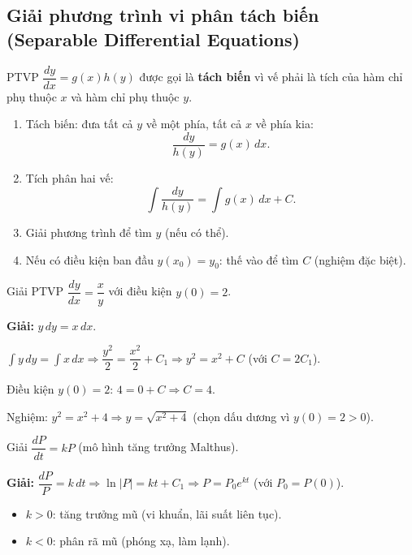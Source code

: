 \documentclass[12pt,a4paper]{article}
\begin{document}
\subsection{Giải phương trình vi phân tách biến (Separable Differential Equations)}

\begin{dinhnghia}[title={PTVP tách biến}]
  PTVP $\dfrac{dy}{dx} = g(x) h(y)$ được gọi là \textbf{tách biến} vì vế phải là tích của hàm chỉ phụ thuộc $x$ và hàm chỉ phụ thuộc $y$.
\end{dinhnghia}

\begin{phuongphap}[title={Giải PTVP tách biến}]
  \begin{enumerate}
    \item Tách biến: đưa tất cả $y$ về một phía, tất cả $x$ về phía kia:
      \[
        \frac{dy}{h(y)} = g(x)\,dx.
      \]
    \item Tích phân hai vế:
      \[
        \int \frac{dy}{h(y)} = \int g(x)\,dx + C.
      \]
    \item Giải phương trình để tìm $y$ (nếu có thể).
    \item Nếu có điều kiện ban đầu $y(x_0) = y_0$: thế vào để tìm $C$ (nghiệm đặc biệt).
  \end{enumerate}
\end{phuongphap}

\begin{vidu}
  Giải PTVP $\dfrac{dy}{dx} = \dfrac{x}{y}$ với điều kiện $y(0) = 2$.

  \medskip\textbf{Giải:}
  $y\,dy = x\,dx$.

  $\displaystyle\int y\,dy = \int x\,dx \Rightarrow \dfrac{y^2}{2} = \dfrac{x^2}{2} + C_1 \Rightarrow y^2 = x^2 + C$ (với $C = 2C_1$).

  Điều kiện $y(0) = 2$: $4 = 0 + C \Rightarrow C = 4$.

  Nghiệm: $y^2 = x^2 + 4 \Rightarrow y = \sqrt{x^2 + 4}$ (chọn dấu dương vì $y(0) = 2 > 0$).
\end{vidu}

\begin{vidu}[title={Mô hình tăng trưởng mũ / phân rã mũ}]
  Giải $\dfrac{dP}{dt} = kP$ (mô hình tăng trưởng Malthus).

  \medskip\textbf{Giải:}
  $\dfrac{dP}{P} = k\,dt \Rightarrow \ln|P| = kt + C_1 \Rightarrow P = P_0 e^{kt}$ (với $P_0 = P(0)$).

  \begin{itemize}
    \item $k > 0$: tăng trưởng mũ (vi khuẩn, lãi suất liên tục).
    \item $k < 0$: phân rã mũ (phóng xạ, làm lạnh).
  \end{itemize}
\end{vidu}
\end{document}
